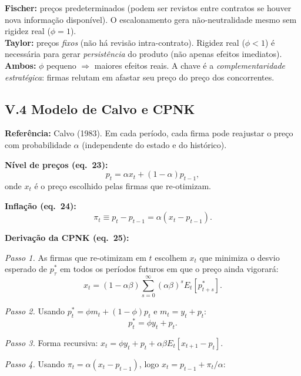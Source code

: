 \documentclass[12pt, a4paper]{article}
\begin{document}
\begin{provabox}[title={Comparação Fischer e Taylor --- Para a Prova}]
\textbf{Fischer:} preços predeterminados (podem ser revistos entre contratos se houver nova informação disponível). O escalonamento gera não-neutralidade mesmo sem rigidez real ($\phi=1$).\\
\textbf{Taylor:} preços \emph{fixos} (não há revisão intra-contrato). Rigidez real ($\phi<1$) é necessária para gerar \emph{persistência} do produto (não apenas efeitos imediatos).\\
\textbf{Ambos:} $\phi$ pequeno $\Rightarrow$ maiores efeitos reais. A chave é a \emph{complementaridade estratégica}: firmas relutam em afastar seu preço do preço dos concorrentes.
\end{provabox}

\subsection*{V.4 Modelo de Calvo e CPNK}

\textbf{Referência:} Calvo (1983). Em cada período, cada firma pode reajustar o preço com probabilidade $\alpha$ (independente do estado e do histórico).

\textbf{Nível de preços (eq.\ 23):}
\begin{equation}
p_t = \alpha x_t + (1-\alpha)p_{t-1}, \tag{eq.\ 23}
\end{equation}
onde $x_t$ é o preço escolhido pelas firmas que re-otimizam.

\textbf{Inflação (eq.\ 24):}
\begin{equation}
\pi_t \equiv p_t - p_{t-1} = \alpha(x_t - p_{t-1}). \tag{eq.\ 24}
\end{equation}

\textbf{Derivação da CPNK (eq.\ 25):}

\textit{Passo 1.} As firmas que re-otimizam em $t$ escolhem $x_t$ que minimiza o desvio esperado de $p_\tau^*$ em todos os períodos futuros em que o preço ainda vigorará:
\[
x_t = (1-\alpha\beta)\sum_{s=0}^\infty (\alpha\beta)^s E_t[p_{t+s}^*].
\]

\textit{Passo 2.} Usando $p_t^* = \phi m_t + (1-\phi)p_t$ e $m_t = y_t + p_t$:
\[
p_t^* = \phi y_t + p_t.
\]

\textit{Passo 3.} Forma recursiva: $x_t = \phi y_t + p_t + \alpha\beta E_t[x_{t+1} - p_t]$.

\textit{Passo 4.} Usando $\pi_t = \alpha(x_t - p_{t-1})$, logo $x_t = p_{t-1} + \pi_t/\alpha$:
\end{document}
